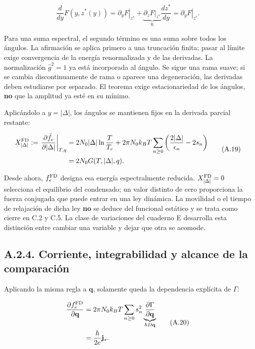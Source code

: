 \documentclass[
  spanish,
  10pt,
  a4paper,
]{article}
\begin{document}
\[
\frac{d}{dy}F(y,z^*(y))
=\left.\partial_yF\right|_{z^*}
+\underbrace{\left.\partial_zF\right|_{z^*}}_{0}
\frac{dz^*}{dy}
=\left.\partial_yF\right|_{z^*}.
\tag{A.18}
\]

Para una suma espectral, el segundo término es una suma sobre todos los
ángulos. La afirmación se aplica primero a una truncación finita; pasar
al límite exige convergencia de la energía renormalizada y de las
derivadas. La normalización \(\hat g^2=1\) ya está incorporada al
ángulo. Se sigue una rama suave; si se cambia discontinuamente de rama o
aparece una degeneración, las derivadas deben estudiarse por separado.
El teorema exige estacionariedad de los ángulos, \textbf{no} que la
amplitud ya esté en su mínimo.

Aplicándolo a \(y=|\Delta|\), los ángulos se mantienen fijos en la
derivada parcial restante:

\[
\begin{aligned}
X_{|\Delta|}^{\rm FD}
:=\left.\frac{\partial\bar f_e}{\partial|\Delta|}\right|_{T,q}
&=2N_0|\Delta|\ln\frac{T}{T_c}
+2\pi N_0k_BT\sum_{n\geq0}
\left(\frac{2|\Delta|}{\epsilon_n}-2s_n\right)\\
&=2N_0G(T,|\Delta|,q).
\end{aligned}
\tag{A.19}
\]

Desde ahora, \(f_e^{\rm FD}\) designa esa energía espectralmente
reducida. \(X_{|\Delta|}^{\rm FD}=0\) selecciona el equilibrio del
condensado; un valor distinto de cero proporciona la fuerza conjugada
que puede entrar en una ley dinámica. La movilidad o el tiempo de
relajación de dicha ley \textbf{no} se deduce del funcional estático y
se trata como cierre en C.2 y C.5. La clase de variaciones del cuaderno
E desarrolla esta distinción entre cambiar una variable y dejar que otra
se acomode.

\subsection{A.2.4. Corriente, integrabilidad y alcance de la
comparación}\label{a.2.4.-corriente-integrabilidad-y-alcance-de-la-comparaciuxf3n}

Aplicando la misma regla a \(\mathbf q\), solamente queda la dependencia
explícita de \(\Gamma\):

\[
\begin{aligned}
\frac{\partial f_e^{\rm FD}}{\partial\mathbf q}
&=2\pi N_0k_BT\sum_{n\geq0}s_n^2
\underbrace{\frac{\partial\Gamma}{\partial\mathbf q}}_{\hbar D\mathbf q}\\
&=\frac{\hbar}{2e}\mathbf j_s.
\end{aligned}
\tag{A.20}
\]
\end{document}
